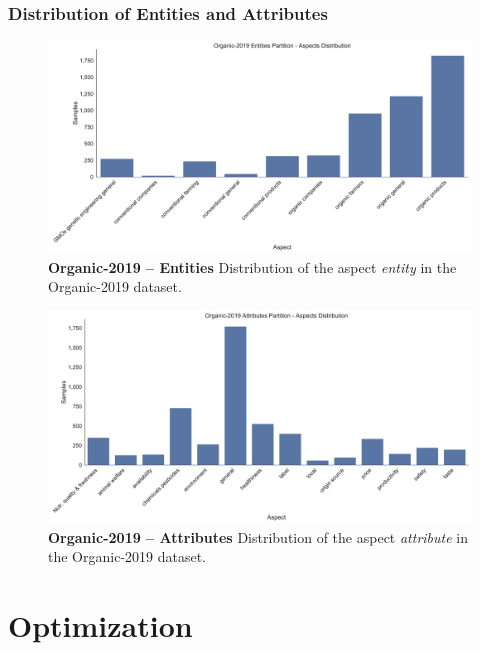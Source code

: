 \subsubsection*{Distribution of Entities and Attributes}

\begin{figure}[H]
	\centering
	\includegraphics[width=\textwidth]{figures/05_setup/05_organicEntities}
	\caption{\textbf{Organic-2019 -- Entities} Distribution of the aspect \textit{entity} in the Organic-2019 dataset.}
	\label{fig:05_organic2019_Entities}
\end{figure}

\begin{figure}[H]
	\centering
	\includegraphics[width=\textwidth]{figures/05_setup/05_organicAttributes}
	\caption{\textbf{Organic-2019 -- Attributes} Distribution of the aspect \textit{attribute} in the Organic-2019 dataset.}
	\label{fig:05_organic2019_Attributes}
\end{figure}

	

\section{Optimization}

